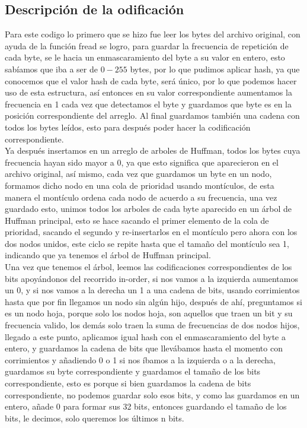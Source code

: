 \documentclass[12 pt]{report}
\begin{document}
\subsection{Descripción de la odificación}
Para este codigo lo primero que se hizo fue leer los bytes del archivo original, con ayuda de la función fread se logro, para guardar la frecuencia de repetición de cada byte, se le hacia un enmascaramiento del byte a su valor en entero, esto sabíamos que iba a ser de $0-255$ bytes, por lo que pudimos aplicar hash, ya que conocemos que el valor hash de cada byte, será único, por lo que podemos hacer uso de esta estructura, así entonces en su valor correspondiente aumentamos la frecuencia en 1 cada vez que detectamos el byte y guardamos que byte es en la posición correspondiente del arreglo. Al final guardamos también una cadena con todos los bytes leídos, esto para después poder hacer la codificación correspondiente.\\
Ya después insertamos en un arreglo de arboles de Huffman, todos los bytes cuya frecuencia hayan sido mayor a 0, ya que esto significa que aparecieron en el archivo original, así mismo, cada vez que guardamos un byte en un nodo, formamos dicho nodo en una cola de prioridad usando montículos, de esta manera el montículo ordena cada nodo de acuerdo a su frecuencia, una vez guardado esto, unimos todos los arboles de cada byte aparecido en un árbol de Huffman principal, esto se hace sacando el primer elemento de la cola de prioridad, sacando el segundo y re-insertarlos en el montículo pero ahora con los dos nodos unidos, este ciclo se repite hasta que el tamaño del montículo sea 1, indicando que ya tenemos el árbol de Huffman principal.\\
Una vez que tenemos el árbol, leemos las codificaciones correspondientes de los bits apoyándonos del recorrido in-order, si nos vamos a la izquierda aumentamos un 0, y si nos vamos a la derecha un 1 a una cadena de bits, usando corrimientos hasta que por fin llegamos un nodo sin algún hijo, después de ahí, preguntamos si es un nodo hoja, porque solo los nodos hoja, son aquellos que traen un bit y su frecuencia valido, los demás solo traen la suma de frecuencias de dos nodos hijos, llegado a este punto, aplicamos igual hash con el enmascaramiento del byte a entero, y guardamos la cadena de bits que llevábamos hasta el momento con corrimientos y añadiendo 0 o 1 si nos íbamos a la izquierda o a la derecha, guardamos su byte correspondiente y guardamos el tamaño de los bits correspondiente, esto es porque si bien guardamos la cadena de bits correspondiente, no podemos guardar solo esos bits, y como las guardamos en un entero, añade 0 para formar sus 32 bits, entonces guardando el tamaño de los bits, le decimos, solo queremos los últimos n bits.\\
\end{document}
